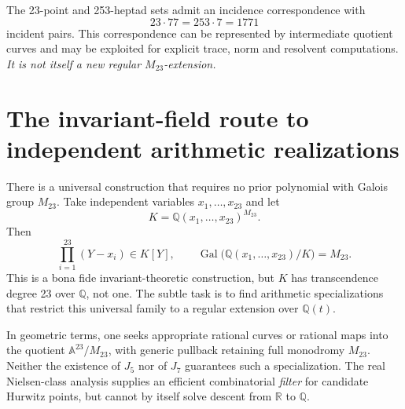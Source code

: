 \documentclass[11pt,letterpaper]{article}
\theoremstyle{definition}
\newcommand{\QQ}{\mathbb{Q}}
\newcommand{\Gal}{\operatorname{Gal}}
\begin{document}
The 23-point and 253-heptad sets admit an incidence correspondence with
\[
23\cdot77=253\cdot7=1771
\]
incident pairs. This correspondence can be represented by intermediate quotient curves and may be exploited for explicit trace, norm and resolvent computations. \emph{It is not itself a new regular \(M_{23}\)-extension.}

\section{The invariant-field route to independent arithmetic realizations}
There is a universal construction that requires no prior polynomial with Galois group \(M_{23}\). Take independent variables \(x_1,\ldots,x_{23}\) and let
\[
K=\QQ(x_1,\ldots,x_{23})^{M_{23}}.
\]
Then
\[
\prod_{i=1}^{23}(Y-x_i)\in K[Y],\qquad
\Gal\bigl(\QQ(x_1,\ldots,x_{23})/K\bigr)=M_{23}.
\]
This is a bona fide invariant-theoretic construction, but \(K\) has transcendence degree 23 over \(\QQ\), not one. The subtle task is to find arithmetic specializations that restrict this universal family to a regular extension over \(\QQ(t)\).

In geometric terms, one seeks appropriate rational curves or rational maps into the quotient \(\mathbb A^{23}/M_{23}\), with generic pullback retaining full monodromy \(M_{23}\). Neither the existence of \(J_5\) nor of \(J_7\) guarantees such a specialization. The real Nielsen-class analysis supplies an efficient combinatorial \emph{filter} for candidate Hurwitz points, but cannot by itself solve descent from \(\mathbb R\) to \(\QQ\).
\end{document}
